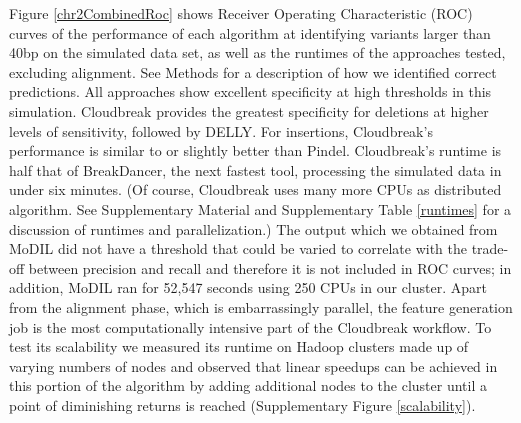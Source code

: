 \documentclass[11pt]{article}
\begin{document}
Figure \ref{chr2CombinedRoc} shows Receiver Operating Characteristic (ROC) curves of the performance of each algorithm at identifying variants larger than 40bp on the simulated data set, as well as the runtimes of the approaches tested, excluding alignment. See Methods for a description of how we identified correct predictions. All approaches show excellent specificity at high thresholds in this simulation. Cloudbreak provides the greatest specificity for deletions at higher levels of sensitivity, followed by DELLY. For insertions, Cloudbreak's performance is similar to or slightly better than Pindel. Cloudbreak's runtime is half that of BreakDancer, the next fastest tool, processing the simulated data in under six minutes. (Of course, Cloudbreak uses many more CPUs as distributed algorithm. See Supplementary Material and Supplementary Table \ref{runtimes} for a discussion of runtimes and parallelization.) The output which we obtained from MoDIL did not have a threshold that could be varied to correlate with the trade-off between precision and recall and therefore it is not included in ROC curves; in addition, MoDIL ran for 52,547 seconds using 250 CPUs in our cluster. Apart from the alignment phase, which is embarrassingly parallel, the feature generation job is the most computationally intensive part of the Cloudbreak workflow. To test its scalability we measured its runtime on Hadoop clusters made up of varying numbers of nodes and observed that linear speedups can be achieved in this portion of the algorithm by adding additional nodes to the cluster until a point of diminishing returns is reached (Supplementary Figure \ref{scalability}).
\end{document}
